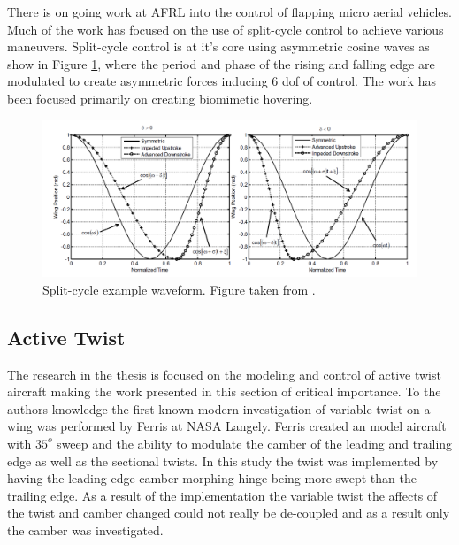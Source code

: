 \documentclass[11pt]{ucthesis}
\begin{document}
There is on going work at AFRL into the control of flapping micro aerial vehicles. Much of the work has focused on the use of split-cycle control to achieve various maneuvers. \cite{weintraub2014implementation} Split-cycle control is at it's core using asymmetric cosine waves as show in Figure \ref{fig:splitCycle}, where the period and phase of the rising and falling edge are modulated to create asymmetric forces inducing 6 dof of control. The  work has been focused primarily on creating biomimetic hovering. \cite{doman2010wingbeat,oppenheimer2011dynamics}

\begin{figure}[thpb]
\centering
\includegraphics[width=1\linewidth]{./Figures/splitCycle.png}
\caption{Split-cycle example waveform. Figure taken from  \cite{weintraub2014implementation}.}
\label{fig:splitCycle}
\end{figure}

\subsection{Active Twist}

The research in the thesis is focused on the modeling and control of active twist aircraft making the work presented in this section of critical importance. To the authors knowledge the first known modern investigation of variable twist on a wing was performed by Ferris at NASA Langely. \cite{ferris1977wind} Ferris created an model aircraft with $35^{o}$ sweep and the ability to modulate the camber of the leading and trailing edge as well as the sectional twists. In this study the twist was implemented by having the leading edge camber morphing hinge being more swept than the trailing edge. As a result of the implementation the variable twist the affects of the twist and camber changed could not really be de-coupled and as a result only the camber was investigated.
\end{document}
